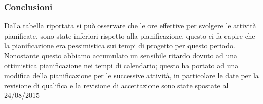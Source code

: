 \subsubsection{Conclusioni}

Dalla tabella riportata si può osservare che le ore effettive per svolgere le attività pianificate, sono state inferiori rispetto alla pianificazione, questo ci fa capire che la pianificazione era pessimistica sui tempi di progetto per questo periodo.
Nonostante questo abbiamo accumulato un sensibile ritardo dovuto ad una ottimistica pianificazione nei tempi di calendario; questo ha portato ad una modifica della pianificazione per le successive attività, in particolare le date per la revisione di qualifica e la revisione di accettazione sono state spostate al 24/08/2015





